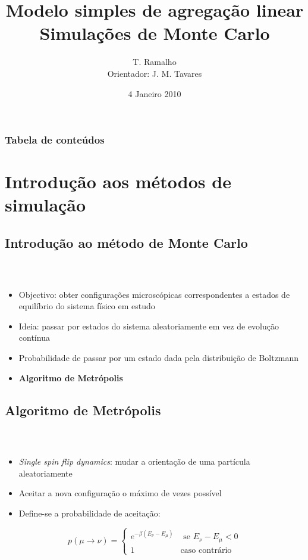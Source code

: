 \documentclass[11pt]{beamer}
\title{{\bfseries Modelo simples de agregação linear}\\Simulações de Monte Carlo}
\author{T. Ramalho\\Orientador: J. M. Tavares}
\date{4 Janeiro 2010}
\begin{document}
\frame{\titlepage}


\section[Conteúdo]{}

\begin{frame}
\frametitle{Tabela de conteúdos}
\tableofcontents
\end{frame}


\section{Introdução aos métodos de simulação}
\subsection{Introdução ao método de Monte Carlo}
\begin{frame}
\frametitle{\insertsection \\ {\small \insertsubsection}}
\begin{itemize}
\item Objectivo: obter configurações microscópicas correspondentes a estados de equilíbrio do sistema físico em estudo
\item Ideia: passar por estados do sistema aleatoriamente em vez de evolução contínua
\item Probabilidade de passar por um estado dada pela distribuição de Boltzmann
\pause
\item \textbf{Algoritmo de Metrópolis}
\end{itemize}
\end{frame}

\subsection{Algoritmo de Metrópolis}
\begin{frame}
\frametitle{\insertsection \\ {\small \insertsubsection}}
\begin{itemize}
\item \textit{Single spin flip dynamics}: mudar a orientação de uma partícula aleatoriamente
\item Aceitar a nova configuração o máximo de vezes possível
\pause
\item Define-se a probabilidade de aceitação:
\end{itemize}

\begin{equation}
	p(\mu\rightarrow\nu)=\left\{ \begin{array}{ll}
				e^{-\beta (E_{\nu}-E_{\mu})} & \mbox{ se $E_{\nu}-E_{\mu} < 0$} \\
				1 &\mbox{caso contrário}
				\end{array}\right.
\end{equation}
\end{frame}
\end{document}
